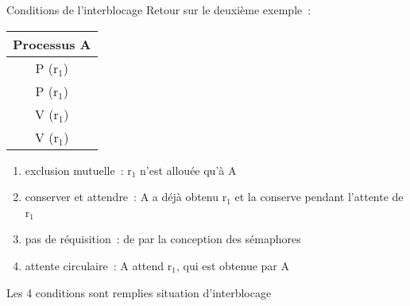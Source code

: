 \begin {frame} {Conditions de l'interblocage}
    Retour sur le deuxième exemple~:
    \begin {center}
	\footnotesize
	\begin {tabular} {c}
	    Processus A \\
	    \hline
	    P (r$_1$) \\
	    P (r$_1$) \\
	    V (r$_1$) \\
	    V (r$_1$) \\
	\end {tabular}
    \end {center}

    \begin {enumerate}
	\item exclusion mutuelle~: r$_1$ n'est allouée qu'à A

	\item conserver et attendre~: A a déjà obtenu r$_1$ et la
	    conserve pendant l'attente de r$_1$

	\item pas de réquisition~: de par la conception des sémaphores

	\item attente circulaire~: A attend r$_1$, qui est obtenue
	    par A

    \end {enumerate}

    Les 4 conditions sont remplies \implique situation d'interblocage
\end {frame}

